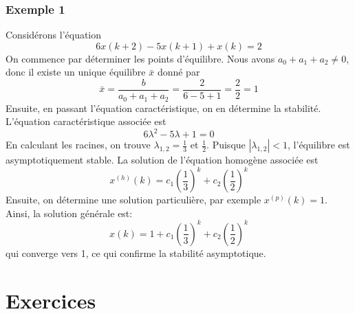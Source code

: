             \subsubsection{Exemple 1}
                Considérons l'équation
                \begin{equation}
                    6x(k+2)-5x(k+1)+x(k) = 2
                \end{equation}
                On commence par déterminer les points d'équilibre. Nous avons $a_0+a_1+a_2 \neq 0$, donc il existe un unique équilibre $\bar{x}$ donné par
                \begin{equation}
                    \bar{x} = \frac{b}{a_0 + a_1 + a_2} = \frac {2}{6 - 5 + 1} = \frac{2}{2} = 1
                \end{equation}
                Ensuite, en passant l'équation caractéristique, on en détermine la stabilité. L'équation caractéristique associée est
                \begin{equation}
                    6\lambda^2-5\lambda+1 = 0
                \end{equation}
                En calculant les racines, on trouve $\lambda_{1,2} = \frac{1}{3}$ et $\frac{1}{2}$. Puisque $|\lambda_{1,2}| < 1$, l'équilibre est asymptotiquement stable.
                La solution de l'équation homogène associée est
                \begin{equation}
                    x^{(h)}(k) = c_1 \left(\frac{1}{3}\right)^k+c_2 \left(\frac{1}{2}\right)^k
                \end{equation}
                Ensuite, on détermine une solution particulière, par exemple $x^{(p)}(k) = 1$. Ainsi, la solution générale est:
                \begin{equation}
                    x(k) = 1+c_1 \left(\frac{1}{3}\right)^k+c_2 \left(\frac{1}{2}\right)^k
                \end{equation}
                qui converge vers 1, ce qui confirme la stabilité asymptotique.
            

    \section{Exercices}
